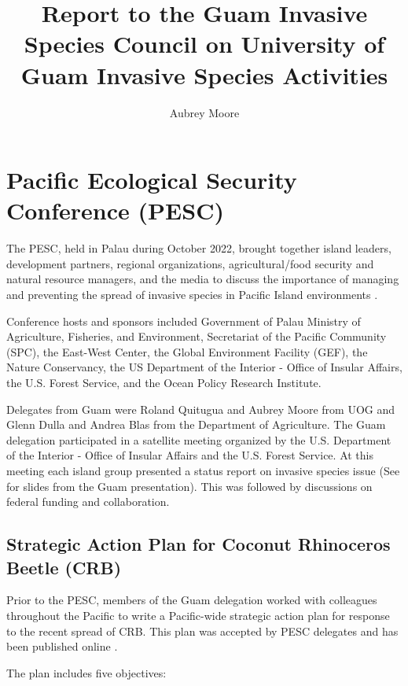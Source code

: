 \documentclass[]{scrartcl}
\title{Report to the Guam Invasive Species Council on University of Guam Invasive Species Activities}
\author{Aubrey Moore}
\begin{document}
\maketitle

\section{Pacific Ecological Security Conference (PESC)}

The PESC, held in Palau during October 2022, brought together island leaders, development partners, regional organizations, agricultural/food security and natural resource managers, and the media to discuss the importance of managing and preventing the spread of invasive species in Pacific Island environments \cite{anonymousFirstPacificEcological2022}.

 Conference hosts and sponsors included Government of Palau Ministry of Agriculture, Fisheries, and Environment, Secretariat of the Pacific Community (SPC), the East-West Center, the Global Environment Facility (GEF), the Nature Conservancy, the US Department of the Interior - Office of Insular Affairs, the U.S. Forest Service, and the Ocean Policy Research Institute.

Delegates from Guam were Roland Quitugua and Aubrey Moore from UOG and Glenn Dulla and Andrea Blas from the Department of Agriculture. The Guam delegation participated in a satellite meeting organized by the U.S. Department of the Interior - Office of Insular Affairs and the U.S. Forest Service. At this meeting each island group presented a status report on invasive species issue (See \parencite{mooreOverviewInvasiveSpecies2022-10-06} for slides from the Guam presentation). This was followed by discussions on federal funding and collaboration.  

\subsection{Strategic Action Plan for Coconut Rhinoceros Beetle (CRB)}

Prior to the PESC, members of the Guam delegation worked with colleagues throughout the Pacific to write a Pacific-wide strategic action plan for response to the recent spread of CRB. This plan was accepted by PESC delegates and has been published online \cite{conferenceStrategicActionPlan2022}.

\newpage

The plan includes five objectives:
\end{document}
